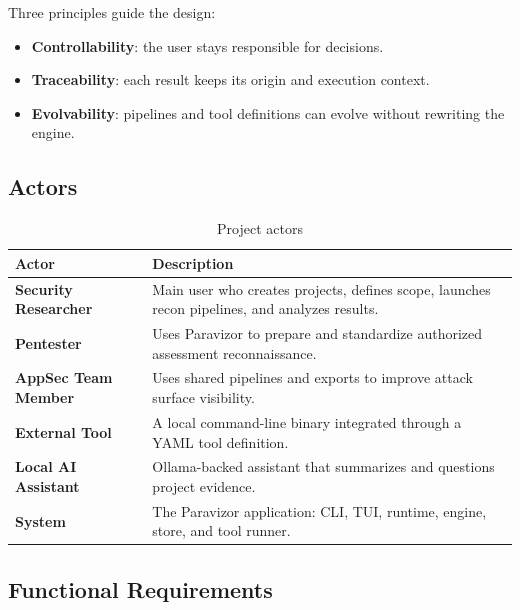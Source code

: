 \documentclass[a4paper,12pt]{article}
\begin{document}
Three principles guide the design:

\begin{itemize}
    \item \textbf{Controllability}: the user stays responsible for decisions.
    \item \textbf{Traceability}: each result keeps its origin and execution context.
    \item \textbf{Evolvability}: pipelines and tool definitions can evolve without rewriting the engine.
\end{itemize}

\subsection{Actors}

\begin{table}[H]
    \centering
    \begin{tabularx}{\textwidth}{>{\bfseries}p{4cm}X}
        \toprule
        Actor & Description \\
        \midrule
        Security Researcher & Main user who creates projects, defines scope, launches recon pipelines, and analyzes results. \\
        Pentester & Uses Paravizor to prepare and standardize authorized assessment reconnaissance. \\
        AppSec Team Member & Uses shared pipelines and exports to improve attack surface visibility. \\
        External Tool & A local command-line binary integrated through a YAML tool definition. \\
        Local AI Assistant & Ollama-backed assistant that summarizes and questions project evidence. \\
        System & The Paravizor application: CLI, TUI, runtime, engine, store, and tool runner. \\
        \bottomrule
    \end{tabularx}
    \caption{Project actors}
    \label{tab:actors}
\end{table}

\subsection{Functional Requirements}
\end{document}
